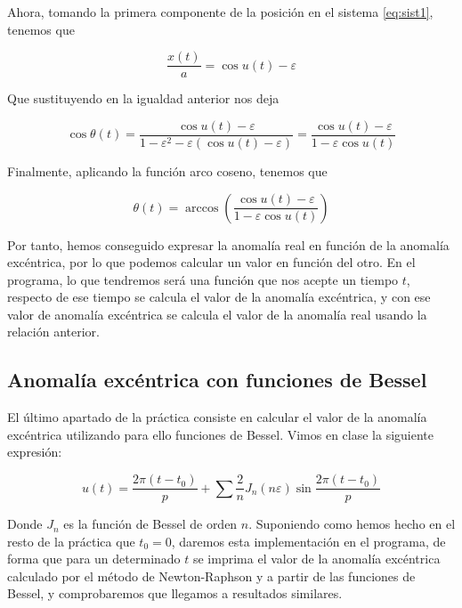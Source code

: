 \documentclass[12pt]{article}
\begin{document}
Ahora, tomando la primera componente de la posición en el sistema
\ref{eq:sist1}, tenemos que

\[
\frac{x(t)}{a} = \cos{u(t)} - \varepsilon
\]

Que sustituyendo en la igualdad anterior nos deja

\[
\cos{\theta(t)} = \frac{\cos{u(t)} - \varepsilon}{1 - \varepsilon^2 -
  \varepsilon(\cos{u(t)} - \varepsilon)} = \frac{\cos{u(t)} -
  \varepsilon}{1 - \varepsilon\cos{u(t)}}
\]

Finalmente, aplicando la función arco coseno, tenemos que

\[
\theta(t) = \arccos\left(\frac{\cos{u(t)} - \varepsilon}{1 -
    \varepsilon\cos{u(t)}}\right)
\]

Por tanto, hemos conseguido expresar la anomalía real en función
de la anomalía excéntrica, por lo que podemos calcular un valor
en función del otro. En el programa, lo que tendremos será una
función que nos acepte un tiempo $t$, respecto de ese tiempo se
calcula el valor de la anomalía excéntrica, y con ese valor de
anomalía excéntrica se calcula el valor de la anomalía real usando
la relación anterior.

\subsection{Anomalía excéntrica con funciones de Bessel}

El último apartado de la práctica consiste en calcular el valor de la
anomalía excéntrica utilizando para ello funciones de Bessel.  Vimos
en clase la siguiente expresión:

\[
u(t) = \frac{2 \pi (t - t_0)}{p} + \sum \frac{2}{n} J_n(n\varepsilon)
\sin{\frac{2 \pi (t - t_0)}{p}}
\]

Donde $J_n$ es la función de Bessel de orden $n$. Suponiendo como
hemos hecho en el resto de la práctica que $t_0 = 0$, daremos esta
implementación en el programa, de forma que para un determinado $t$ se
imprima el valor de la anomalía excéntrica calculado por el método
de Newton-Raphson y a partir de las funciones de Bessel, y comprobaremos
que llegamos a resultados similares.
\end{document}

